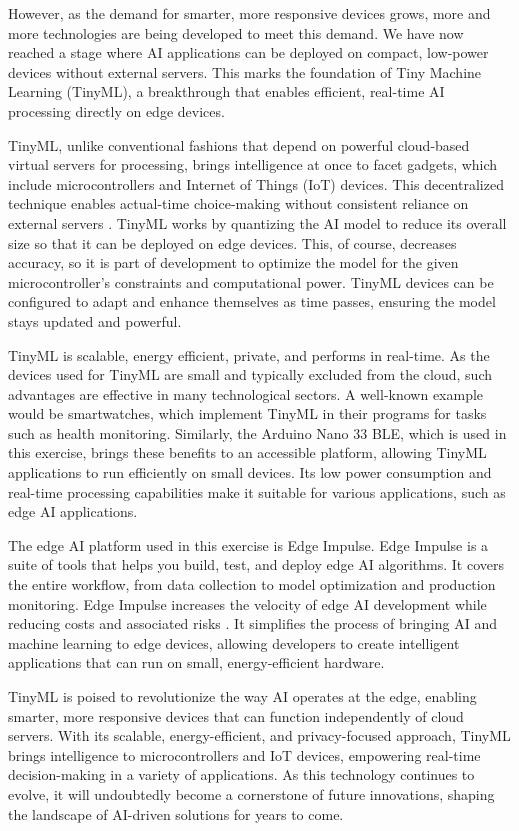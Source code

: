 \documentclass{article}
\begin{document}
However, as the demand for smarter, more responsive devices grows, more and more technologies are being developed to meet this demand. We have now reached a stage where AI applications can be deployed on compact, low-power devices without external servers. This marks the foundation of Tiny Machine Learning (TinyML), a breakthrough that enables efficient, real-time AI processing directly on edge devices.

TinyML, unlike conventional fashions that depend on powerful cloud-based virtual servers for processing, brings intelligence at once to facet gadgets, which include microcontrollers and Internet of Things (IoT) devices. This decentralized technique enables actual-time choice-making without consistent reliance on external servers \cite{TNML}. TinyML works by quantizing the AI model to reduce its overall size so that it can be deployed on edge devices. This, of course, decreases accuracy, so it is part of development to optimize the model for the given microcontroller's constraints and computational power. TinyML devices can be configured to adapt and enhance themselves as time passes, ensuring the model stays updated and powerful.

TinyML is scalable, energy efficient, private, and performs in real-time. As the devices used for TinyML are small and typically excluded from the cloud, such advantages are effective in many technological sectors. A well-known example would be smartwatches, which implement TinyML in their programs for tasks such as health monitoring. Similarly, the Arduino Nano 33 BLE, which is used in this exercise, brings these benefits to an accessible platform, allowing TinyML applications to run efficiently on small devices. Its low power consumption and real-time processing capabilities make it suitable for various applications, such as edge AI applications.

The edge AI platform used in this exercise is Edge Impulse. Edge Impulse is a suite of tools that helps you build, test, and deploy edge AI algorithms. It covers the entire workflow, from data collection to model optimization and production monitoring. Edge Impulse increases the velocity of edge AI development while reducing costs and associated risks \cite{EDGE}. It simplifies the process of bringing AI and machine learning to edge devices, allowing developers to create intelligent applications that can run on small, energy-efficient hardware. 

TinyML is poised to revolutionize the way AI operates at the edge, enabling smarter, more responsive devices that can function independently of cloud servers. With its scalable, energy-efficient, and privacy-focused approach, TinyML brings intelligence to microcontrollers and IoT devices, empowering real-time decision-making in a variety of applications. As this technology continues to evolve, it will undoubtedly become a cornerstone of future innovations, shaping the landscape of AI-driven solutions for years to come.
\end{document}
